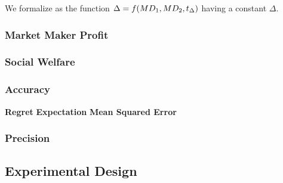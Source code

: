 We formalize  as the function $\Delta = f(MD_{1},MD_{2},t_{\Delta})$
having a constant $\Delta$.\\

\subsubsection{Market Maker Profit}
\subsubsection{Social Welfare}
\subsubsection{Accuracy}
\textbf{Regret}
\textbf{Expectation}
\textbf{Mean Squared Error}
\subsubsection{Precision}

\subsection{Experimental Design}